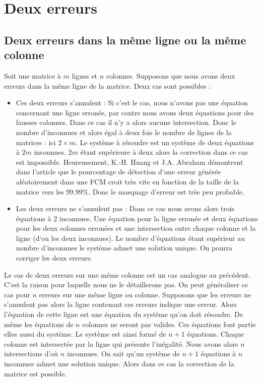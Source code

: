\documentclass[a4paper, 10pt]{report}
\begin{document}
\section{Deux erreurs}
\subsection{Deux erreurs dans la même ligne ou la même colonne}
Soit une matrice à $m$ lignes et $n$ colonnes. Supposons que nous avons deux erreurs dans la même ligne de la matrice. 
Deux cas sont possibles :
\begin{itemize}
 \item Ces deux erreurs s’annulent : Si c’est le cas, nous n’avons pas une équation concernant une ligne erronée, par 
       contre nous avons deux équations pour des fausses colonnes. Dans ce cas il n’y a alors aucune intersection. 
       Donc le nombre d’inconnues et alors égal à deux fois le nombre de lignes de la matrices : ici $2 \times m$.
       \newline
       Le système à résoudre est un système de deux équations à $2m$ inconnues. $2m$ étant supérieure à deux alors 
       la correction dans ce cas est impossible.\newline
       Heureusement, K.-H. Huang et J.A. Abraham démontrent dans l'article que le pourcentage de détection d'une erreur 
       générée  aléatoirement dans une FCM croit très vite en fonction de la taille de la matrice vers les $99.99\%$. 
       Donc le masquage d'erreur est très peu probable.  
 \item Les deux erreurs ne s’annulent pas : Dans ce cas nous avons alors trois équations à 2 inconnues. Une équation 
       pour la ligne erronée et deux équations pour les deux colonnes erronées et une intersection entre chaque colonne 
       et la ligne (d‘ou les deux inconnues). Le nombre d’équations étant supérieur au nombre d’inconnues le système admet 
       une solution unique. On pourra corriger les deux erreurs.
\end{itemize}
Le cas de deux erreurs sur une même colonne est un cas analogue au précédent. C’est la raison pour laquelle nous ne 
le détaillerons pas.\newline
On peut généraliser ce cas pour $n$ erreurs sur une même ligne ou colonne. Supposons que les erreurs ne s’annulent pas 
alors la ligne contenant ces erreurs indique une erreur. Alors l’équation de cette ligne est une équation du système 
qu’on doit résoudre. De même les équations de $n$ colonnes ne seront pas valides. Ces équations font partie elles aussi 
du système. Le système est ainsi formé de $n+1$ équations. Chaque colonne est intersectée par la ligne qui présente l’inégalité. 
Nous avons alors $n$ intersections d’où $n$ inconnues.\newline
On sait qu'un système de $n+1$ équations à $n$ inconnues admet une solution unique. Alors dans ce cas la correction de 
la matrice est possible.
\end{document}
